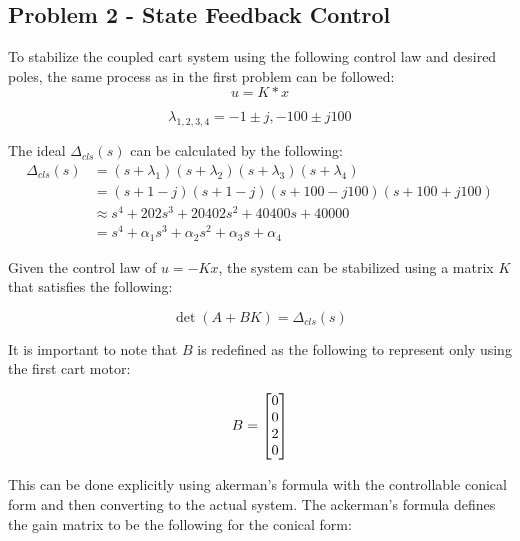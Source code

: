 \documentclass[]{article}
\begin{document}
	\newpage
	\subsection{Problem 2 - State Feedback Control}
		To stabilize the coupled cart system using the following control law and desired poles, the same process as in the first problem can be followed:
		\begin{equation}
			u = K * x
		\end{equation}
	
		\begin{equation}
			\lambda_{1,2,3,4} = {-1 \pm j, -100 \pm j100}
			\label{eq:Desiered_poles2}
		\end{equation}
		
		The ideal $\Delta_{cls} (s)$ can be calculated by the following:
		\begin{equation}
			\begin{aligned}
				\Delta_{cls} (s) &= (s + \lambda_1) (s + \lambda_2) (s + \lambda_3)(s+\lambda_4)\\
				&= (s + 1 - j) (s + 1 -j) (s+ 100 - j100)(s + 100 + j100)\\
				&\approx s^4 + 202 s^3 + 20402 s^2 + 40400 s + 40000\\
				&= s^4 + \alpha_1 s^3 + \alpha_2 s^2 + \alpha_3 s + \alpha_4
			\end{aligned} \label{eq:ideal_char_poly2}
		\end{equation}
		
		Given the control law of $u = - K x$, the system can be stabilized using a matrix $K$ that satisfies the following:
		
		\begin{equation}
			\det(A + B K) = \Delta_{cls} (s)
		\end{equation}
		
		It is important to note that $B$ is redefined as the following to represent only using the first cart motor:
		
		\begin{equation}
			B = \mqty[0\\0\\2\\0]
		\end{equation}
		
		This can be done explicitly using akerman's formula with the controllable conical form and then converting to the actual system. The ackerman's formula defines the gain matrix to be the following for the conical form:
		
\end{document}
